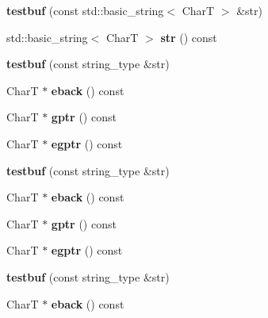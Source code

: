 \begin{DoxyCompactItemize}
\mbox{\label{structtestbuf_aade97a7fab3e46f2b3d604917be590a8}} 
{\bfseries testbuf} (const std\+::basic\+\_\+string$<$ CharT $>$ \&str)
\item 
\mbox{\label{structtestbuf_a077afc7549a2a7a21f840ba884695eab}} 
std\+::basic\+\_\+string$<$ CharT $>$ {\bfseries str} () const
\item 
\mbox{\label{structtestbuf_af4500052e14c24781929e2e23a03b7f4}} 
{\bfseries testbuf} (const string\+\_\+type \&str)
\item 
\mbox{\label{structtestbuf_a1f4df16dc86bc40a9af64b5fff87cef0}} 
CharT $\ast$ {\bfseries eback} () const
\item 
\mbox{\label{structtestbuf_a30875f59e62daf2cf38ec0cd7e79ee68}} 
CharT $\ast$ {\bfseries gptr} () const
\item 
\mbox{\label{structtestbuf_a3aaa639283f34387537715800c38e416}} 
CharT $\ast$ {\bfseries egptr} () const
\item 
\mbox{\label{structtestbuf_af4500052e14c24781929e2e23a03b7f4}} 
{\bfseries testbuf} (const string\+\_\+type \&str)
\item 
\mbox{\label{structtestbuf_a1f4df16dc86bc40a9af64b5fff87cef0}} 
CharT $\ast$ {\bfseries eback} () const
\item 
\mbox{\label{structtestbuf_a30875f59e62daf2cf38ec0cd7e79ee68}} 
CharT $\ast$ {\bfseries gptr} () const
\item 
\mbox{\label{structtestbuf_a3aaa639283f34387537715800c38e416}} 
CharT $\ast$ {\bfseries egptr} () const
\item 
\mbox{\label{structtestbuf_af4500052e14c24781929e2e23a03b7f4}} 
{\bfseries testbuf} (const string\+\_\+type \&str)
\item 
\mbox{\label{structtestbuf_a1f4df16dc86bc40a9af64b5fff87cef0}} 
CharT $\ast$ {\bfseries eback} () const
\item 

\end{DoxyCompactItemize}
